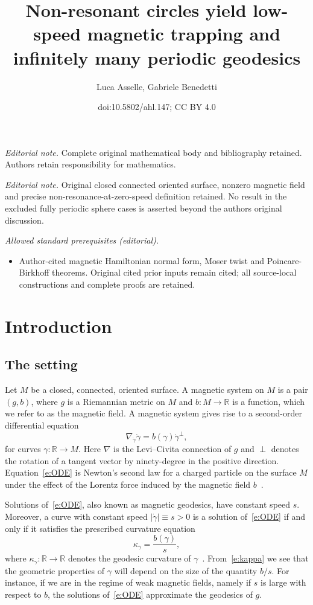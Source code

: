 \documentclass[10pt]{amsart}
\title{Non-resonant circles yield low-speed magnetic trapping and infinitely many periodic geodesics}
\author{Luca Asselle, Gabriele Benedetti}
\date{doi:10.5802/ahl.147; CC BY 4.0}
\theoremstyle{definition}
\newcommand{\R}{\mathbb{R}}
\begin{document}
\maketitle
\noindent\textit{Editorial note.} Complete original mathematical body and bibliography retained. Authors retain responsibility for mathematics.\par\medskip
\noindent\textit{Editorial note.} Original closed connected oriented surface, nonzero magnetic field and precise non-resonance-at-zero-speed definition retained. No result in the excluded fully periodic sphere cases is asserted beyond the authors original discussion.\par\medskip
\noindent\textit{Allowed standard prerequisites (editorial).}\begin{itemize}
\item Author-cited magnetic Hamiltonian normal form, Moser twist and Poincare-Birkhoff theorems. Original cited prior inputs remain cited; all source-local constructions and complete proofs are retained.
\end{itemize}\medskip
\section{Introduction}
\subsection{The setting}
Let $M$ be a closed, connected, oriented surface. A magnetic system on $M$ is a pair $(g,b)$, where $g$ is a Riemannian metric on $M$ and $b:M\to\R$ is a function, which we refer to as the magnetic field. A magnetic system gives rise to a second-order differential equation
\begin{equation}\label{e:ODE}
\nabla_{\dot\gamma}\dot\gamma=b(\gamma)\dot\gamma^\perp,
\end{equation}
for curves $\gamma:\R\to M$. Here $\nabla$ is the Levi--Civita connection of $g$ and $\perp$ denotes the rotation of a tangent vector by ninety-degree in the positive direction. Equation~\eqref{e:ODE} is Newton's second law for a charged particle on the surface $M$ under the effect of the Lorentz force induced by the magnetic field $b$~\cite{AS67,Arn61}.

Solutions of~\eqref{e:ODE}, also known as magnetic geodesics, have constant speed $s$. Moreover, a curve with constant speed $|\dot\gamma|\equiv s>0$ is a solution of~\eqref{e:ODE} if and only if it satisfies the prescribed curvature equation
\begin{equation}\label{e:kappa}
\kappa_\gamma=\frac{b(\gamma)}{s},
\end{equation}
where $\kappa_\gamma:\R\to\R$ denotes the geodesic curvature of $\gamma$~\cite{Arn61,AS67}. From~\eqref{e:kappa} we see that the geometric properties of $\gamma$ will depend on the size of the quantity $b/s$. For instance, if we are in the regime of weak magnetic fields, namely if $s$ is large with respect to $b$, the solutions of~\eqref{e:ODE} approximate the geodesics of $g$.
\end{document}
